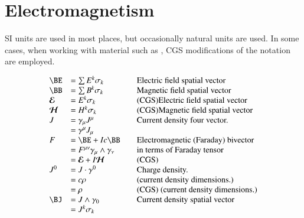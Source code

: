 \section{Electromagnetism}

SI units are
used in most places, but occasionally natural units are used.  In
some cases, when working with material such as \cite{bohm1989qt},
CGS modifications of the notation are employed.

\begin{equation*}
\begin{array}{l l l}
\BE &= \sum E^k \sigma_k & \quad \mbox{Electric field spatial vector} \\
\BB &= \sum B^k \sigma_k & \quad \mbox{Magnetic field spatial vector} \\
\EE &= E^k \sigma_k & \quad \mbox{(CGS)Electric field spatial vector} \\
\HH &= H^k \sigma_k & \quad \mbox{(CGS)Magnetic field spatial vector} \\
J &= \gamma_{\mu} J^{\mu} & \quad \mbox{Current density four vector.} \\
  &= \gamma^{\mu} J_{\mu} \\
F &= \BE + I c \BB & \quad \mbox{Electromagnetic (Faraday) bivector} \\
  &= F^{\mu\nu} \gamma_\mu \wedge \gamma_\nu & \quad \mbox{in terms of Faraday tensor} \\
  &= \EE + I \HH & \quad \mbox{(CGS)} \\
J^{0} &= J \cdot \gamma^0 & \quad \mbox{Charge density.} \\
      &= c \rho & \quad \mbox{(current density dimensions.)} \\
      &= \rho & \quad \mbox{(CGS) (current density dimensions.)} \\
\BJ &= J \wedge \gamma_0 & \quad \mbox{Current density spatial vector} \\
    &= J^k \sigma_k \\
\end{array}
\end{equation*}

